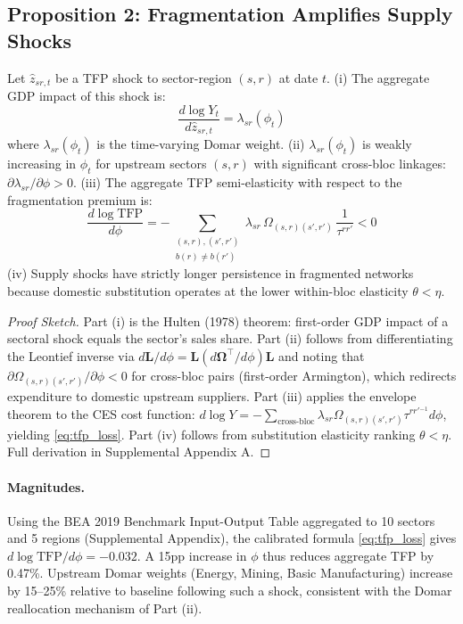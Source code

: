 \subsection{Proposition 2: Fragmentation Amplifies Supply Shocks}

\begin{theorem}
  \label{thm:fragmentation}
  Let $\hat{z}_{sr,t}$ be a TFP shock to sector-region $(s,r)$ at date $t$.
  (i) The aggregate GDP impact of this shock is:
  \begin{equation}
    \frac{d\log Y_t}{d\hat z_{sr,t}} = \lambda_{sr}(\phi_t)
    \label{eq:domar_impact}
  \end{equation}
  where $\lambda_{sr}(\phi_t)$ is the time-varying Domar weight.
  (ii) $\lambda_{sr}(\phi_t)$ is weakly increasing in $\phi_t$ for upstream
  sectors $(s,r)$ with significant cross-bloc linkages:
  $\partial\lambda_{sr}/\partial\phi > 0$.
  (iii) The aggregate TFP semi-elasticity with respect to the fragmentation
  premium is:
  \begin{equation}
    \frac{d\log\mathrm{TFP}}{d\phi} = -\!\!\!
    \sum_{\substack{(s,r),(s',r')\\b(r)\neq b(r')}}
    \lambda_{sr}\,\Omega_{(s,r)(s',r')}\,\frac{1}{\tau^{rr'}} < 0
    \label{eq:tfp_loss}
  \end{equation}
  (iv) Supply shocks have strictly longer persistence in fragmented networks
  because domestic substitution operates at the lower within-bloc elasticity
  $\theta < \eta$.
\end{theorem}

\begin{proof}[Proof Sketch]
  Part (i) is the Hulten (1978) theorem: first-order GDP impact of a sectoral
  shock equals the sector's sales share. Part (ii) follows from differentiating
  the Leontief inverse via $d\mathbf{L}/d\phi =
  \mathbf{L}(d\boldsymbol\Omega^\top/d\phi)\mathbf{L}$ and noting that
  $\partial\Omega_{(s,r)(s',r')}/\partial\phi < 0$ for cross-bloc pairs
  (first-order Armington), which redirects expenditure to domestic upstream
  suppliers. Part (iii) applies the envelope theorem to the CES cost function:
  $d\log Y = -\sum_{\text{cross-bloc}}\lambda_{sr}\Omega_{(s,r)(s',r')}
  \tau^{rr'{}^{-1}}d\phi$, yielding \eqref{eq:tfp_loss}. Part (iv) follows
  from substitution elasticity ranking $\theta < \eta$.
  Full derivation in Supplemental Appendix A.
\end{proof}

\paragraph{Magnitudes.}
Using the BEA 2019 Benchmark Input-Output Table aggregated to 10 sectors and
5 regions (Supplemental Appendix), the calibrated formula \eqref{eq:tfp_loss}
gives $d\log\mathrm{TFP}/d\phi = -0.032$. A 15pp increase in $\phi$ thus
reduces aggregate TFP by 0.47\%. Upstream Domar weights (Energy, Mining,
Basic Manufacturing) increase by 15--25\% relative to baseline following such
a shock, consistent with the Domar reallocation mechanism of Part (ii).

